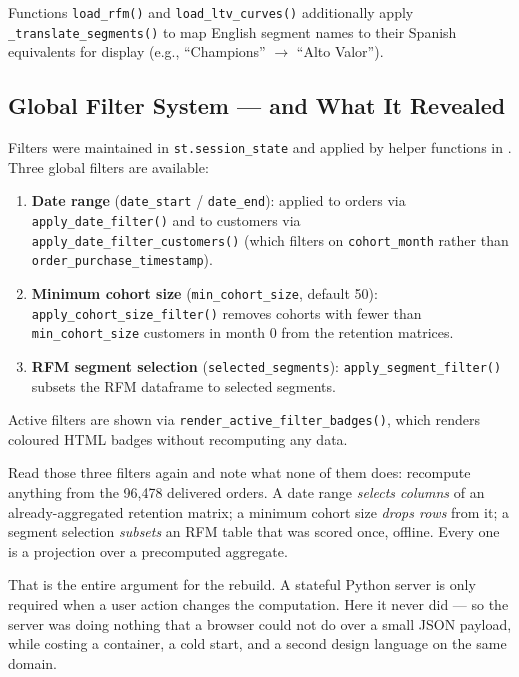 Functions \texttt{load\_rfm()} and \texttt{load\_ltv\_curves()} additionally
apply \texttt{\_translate\_segments()} to map English segment names to their
Spanish equivalents for display (e.g., ``Champions'' $\to$ ``Alto Valor'').

\subsection{Global Filter System --- and What It Revealed}

Filters were maintained in \texttt{st.session\_state} and applied by helper
functions in . Three global filters are
available:

\begin{enumerate}
  \item \textbf{Date range} (\texttt{date\_start} / \texttt{date\_end}): applied
    to orders via \texttt{apply\_date\_filter()} and to customers via
    \texttt{apply\_date\_filter\_customers()} (which filters on
    \texttt{cohort\_month} rather than \texttt{order\_purchase\_timestamp}).
  \item \textbf{Minimum cohort size} (\texttt{min\_cohort\_size}, default 50):
    \texttt{apply\_cohort\_size\_filter()} removes cohorts with fewer than
    \texttt{min\_cohort\_size} customers in month 0 from the retention matrices.
  \item \textbf{RFM segment selection} (\texttt{selected\_segments}):
    \texttt{apply\_segment\_filter()} subsets the RFM dataframe to selected segments.
\end{enumerate}

Active filters are shown via \texttt{render\_active\_filter\_badges()}, which
renders coloured HTML badges without recomputing any data.

\begin{keyinsight}
Read those three filters again and note what none of them does: recompute
anything from the 96,478 delivered orders. A date range \emph{selects columns} of
an already-aggregated retention matrix; a minimum cohort size \emph{drops rows}
from it; a segment selection \emph{subsets} an RFM table that was scored once,
offline. Every one is a projection over a precomputed aggregate.

That is the entire argument for the rebuild. A stateful Python server is only
required when a user action changes the computation. Here it never did --- so the
server was doing nothing that a browser could not do over a small JSON payload,
while costing a container, a cold start, and a second design language on the
same domain.
\end{keyinsight}

